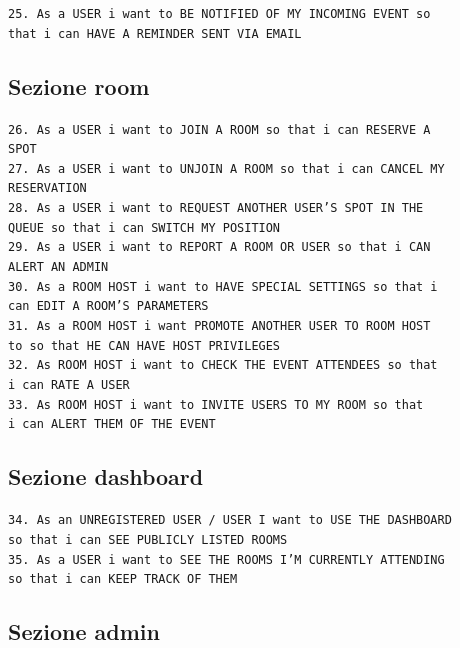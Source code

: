 	\texttt{25. As a USER i want to BE NOTIFIED OF MY INCOMING EVENT so \\ that i can HAVE A REMINDER SENT VIA EMAIL}
	
	\subsection{Sezione room}
	
	\texttt{26. As a USER i want to JOIN A ROOM so that i can RESERVE A \\ SPOT}\\
	\texttt{27. As a USER i want to UNJOIN A ROOM so that i can CANCEL MY\\  RESERVATION}\\
	\texttt{28. As a USER i want to REQUEST ANOTHER USER'S SPOT IN THE \\ QUEUE so that i can SWITCH MY POSITION}\\
	\texttt{29. As a USER i want to REPORT A ROOM OR USER so that i CAN \\ ALERT AN ADMIN}\\
	\texttt{30. As a ROOM HOST i want to HAVE SPECIAL SETTINGS so that i \\ can EDIT A ROOM’S PARAMETERS}\\
	\texttt{31. As a ROOM HOST i want PROMOTE ANOTHER USER TO ROOM HOST \\ to so that HE CAN HAVE HOST PRIVILEGES}\\
	\texttt{32. As ROOM HOST i want to CHECK THE EVENT ATTENDEES so that\\  i can RATE A USER}\\
	\texttt{33. As ROOM HOST i want to INVITE USERS TO MY ROOM so that \\i can ALERT THEM OF THE EVENT}
	
	\subsection{Sezione dashboard}
	
	\texttt{34. As an UNREGISTERED USER / USER I want to USE THE DASHBOARD\\ so that i can SEE PUBLICLY LISTED ROOMS}\\
	\texttt{35. As a USER i want to SEE THE ROOMS I’M CURRENTLY ATTENDING\\ so that i can KEEP TRACK OF THEM}
	
	\subsection{Sezione admin}
	
